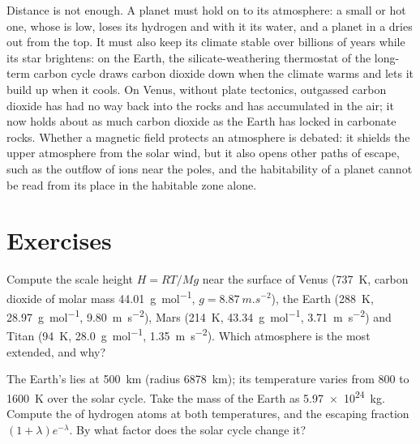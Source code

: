 Distance is not enough. A planet must hold on to its atmosphere: a small
or hot one, whose  is low, loses its hydrogen and with it
its water, and a planet in a  dries out from the top. It
must also keep its climate stable over billions of years while its star
brightens: on the Earth, the silicate-weathering thermostat of the
long-term carbon cycle draws carbon dioxide down when the climate warms
and lets it build up when it cools. On Venus, without plate tectonics,
outgassed carbon dioxide has had no way back into the rocks and has
accumulated in the air; it now holds about as much carbon dioxide as the
Earth has locked in carbonate rocks. Whether a magnetic field protects an
atmosphere is debated: it shields the upper atmosphere from the solar
wind, but it also opens other paths of escape, such as the outflow of ions
near the poles, and the habitability of a planet cannot be read from its
place in the habitable zone alone.

\section{Exercises}

\begin{exercise}[$\star$]\label{exo:b3:planetary-atmospheres:1}
Compute the scale height $H = RT/Mg$ near the surface of Venus
(\qty{737}{K}, carbon dioxide of molar mass \qty{44.01}{g.mol^{-1}},
$g = \qty{8.87}{m.s^{-2}}$), the Earth (\qty{288}{K},
\qty{28.97}{g.mol^{-1}}, \qty{9.80}{m.s^{-2}}), Mars (\qty{214}{K},
\qty{43.34}{g.mol^{-1}}, \qty{3.71}{m.s^{-2}}) and Titan (\qty{94}{K},
\qty{28.0}{g.mol^{-1}}, \qty{1.35}{m.s^{-2}}). Which atmosphere is the
most extended, and why?
\end{exercise}

\begin{exercise}[$\star$]\label{exo:b3:planetary-atmospheres:2}
The Earth's  lies at \qty{500}{km} (radius \qty{6878}{km}); its
temperature varies from 800 to \qty{1600}{K} over the solar cycle. Take
the mass of the Earth as \qty{5.97e24}{kg}. Compute the 
of hydrogen atoms at both temperatures, and the escaping fraction
$(1 + \lambda)e^{-\lambda}$. By what factor does the solar cycle change it?
\end{exercise}


